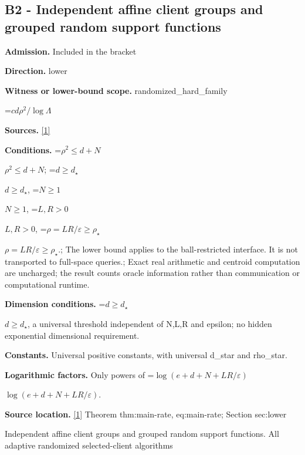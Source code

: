 \documentclass[10pt,a4paper]{article}
\newcommand{\AtlasMath}[1]{\par\begingroup\centering\setbox0=\hbox{$\displaystyle #1$}\ifdim\wd0>1.4\linewidth\typeout{ATLAS WIDE FORMULA: \the\wd0}\fi\ifdim\wd0>\linewidth\resizebox{\linewidth}{!}{\box0}\else\box0\fi\par\endgroup}
\newcommand{\AtlasInlineMath}[1]{\begingroup\setbox0=\hbox{$#1$}\ifdim\wd0>.4\linewidth\endgroup\AtlasMath{#1}\else\endgroup$#1$\fi}
\begin{document}
\subsection{B2 - Independent affine client groups and grouped random support functions}


\textbf{Admission.} Included in the bracket



\textbf{Direction.} lower



\textbf{Witness or lower-bound scope.} randomized\_hard\_family



\AtlasMath{cd\rho^2/\log\Lambda}


\textbf{Sources.} \href{https://github.com/WU-Wendao/Colombo/blob/main/colombo_sensorium/Complexity_altas/data/sources/colombo/U05/manuscript.pdf}{[1]}



\textbf{Conditions.} \AtlasInlineMath{\rho^2\le d+N}; \AtlasInlineMath{d\ge d_\star}, \AtlasInlineMath{N\ge1}, \AtlasInlineMath{L,R>0}, \AtlasInlineMath{\rho=LR/\varepsilon\ge\rho_\star}.; The lower bound applies to the ball-restricted interface. It is not transported to full-space queries.; Exact real arithmetic and centroid computation are uncharged; the result counts oracle information rather than communication or computational runtime.



\textbf{Dimension conditions.} \AtlasInlineMath{d\ge d_\star}, a universal threshold independent of N,L,R and epsilon; no hidden exponential dimensional requirement.



\textbf{Constants.} Universal positive constants, with universal d\_star and rho\_star.



\textbf{Logarithmic factors.} Only powers of \AtlasInlineMath{\log(e+d+N+LR/\varepsilon)}.



\textbf{Source location.} \href{https://github.com/WU-Wendao/Colombo/blob/main/colombo_sensorium/Complexity_altas/data/sources/colombo/U05/manuscript.pdf}{[1]} Theorem thm:main-rate, eq:main-rate; Section sec:lower



Independent affine client groups and grouped random support functions. All adaptive randomized selected-client algorithms
\end{document}
